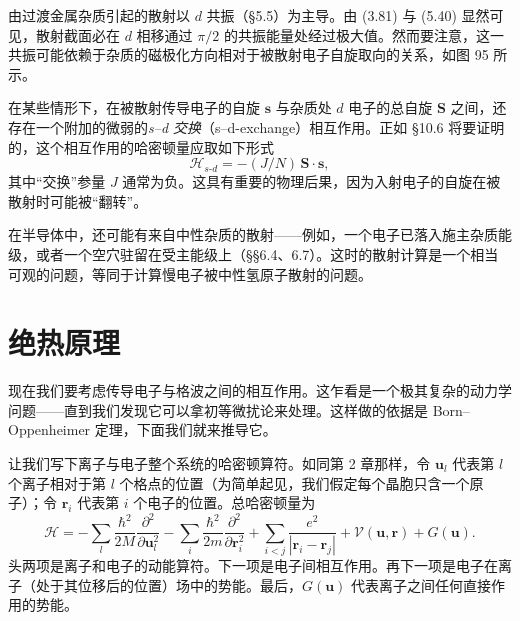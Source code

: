 
由过渡金属杂质引起的散射以 $d$ 共振（§5.5）为主导。由 (3.81) 与 (5.40) 显然可见，散射截面必在 $d$ 相移通过 $\pi/2$ 的共振能量处经过极大值。然而要注意，这一共振可能依赖于杂质的磁极化方向相对于被散射电子自旋取向的关系，如图 95 所示。

在某些情形下，在被散射传导电子的自旋 $\mathbf{s}$ 与杂质处 $d$ 电子的总自旋 $\mathbf{S}$ 之间，还存在一个附加的微弱的\emph{s--d 交换}（s--d-exchange）相互作用。正如 §10.6 将要证明的，这个相互作用的哈密顿量应取如下形式
\begin{equation*}
\mathcal{H}_{s\text{-}d} = -(J/N)\,\mathbf{S}\cdot\mathbf{s}, \tag{6.71}
\end{equation*}
其中“交换”参量 $J$ 通常为负。这具有重要的物理后果，因为入射电子的自旋在被散射时可能被“翻转”。

在半导体中，还可能有来自中性杂质的散射——例如，一个电子已落入施主杂质能级，或者一个空穴驻留在受主能级上（§§6.4、6.7）。这时的散射计算是一个相当可观的问题，等同于计算慢电子被中性氢原子散射的问题。

\section{绝热原理}

现在我们要考虑传导电子与格波之间的相互作用。这乍看是一个极其复杂的动力学问题——直到我们发现它可以拿初等微扰论来处理。这样做的依据是 Born--Oppenheimer 定理，下面我们就来推导它。

让我们写下离子与电子整个系统的哈密顿算符。如同第 2 章那样，令 $\mathbf{u}_l$ 代表第 $l$ 个离子相对于第 $l$ 个格点的位置（为简单起见，我们假定每个晶胞只含一个原子）；令 $\mathbf{r}_i$ 代表第 $i$ 个电子的位置。总哈密顿量为
\begin{equation*}
\mathcal{H} = -\sum_{l}\frac{\hbar^{2}}{2M}\frac{\partial^{2}}{\partial\mathbf{u}_{l}^{2}} - \sum_{i}\frac{\hbar^{2}}{2m}\frac{\partial^{2}}{\partial\mathbf{r}_{i}^{2}} + \sum_{i<j}\frac{e^{2}}{|\mathbf{r}_{i}-\mathbf{r}_{j}|} + \mathcal{V}(\mathbf{u},\mathbf{r}) + G(\mathbf{u}). \tag{6.72}
\end{equation*}
头两项是离子和电子的动能算符。下一项是电子间相互作用。再下一项是电子在离子（处于其位移后的位置）场中的势能。最后，$G(\mathbf{u})$ 代表离子之间任何直接作用的势能。

